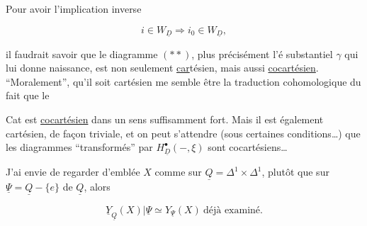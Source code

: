 

Pour avoir l'implication inverse

\[
i\in W_{\underline D}\Longrightarrow i_0\in W_{\underline D},
\]

il faudrait savoir que le diagramme $(**)$, plus  précisément l'é  substantiel $\gamma$ qui lui donne naissance, est non seulement \uline{car}tésien, mais aussi \uline{cocartésien}. ``Moralement'', qu'il soit cartésien me semble être la traduction cohomologique du fait que le 


 Cat  est \uline{cocartésien} dans un sens suffisamment fort. Mais il est également cartésien, de façon triviale, et on peut s'attendre (sous certaines conditions\ldots) que les diagrammes ``transformés'' par $H^\bullet_{\underline D}(-,\xi)$ sont cocartésiens\ldots

J'ai envie de regarder d'emblée $X$ comme sur $\underline Q=\Delta^1\times\Delta^1$, plutôt que sur  $\underline\Psi=\underline Q-\{e\}$ de $\underline Q$, alors

\[
\underline Y_{\underline Q}(X)|\underline\Psi\simeq Y_{\underline\Psi}(X)\ \text{déjà examiné.}
\]
